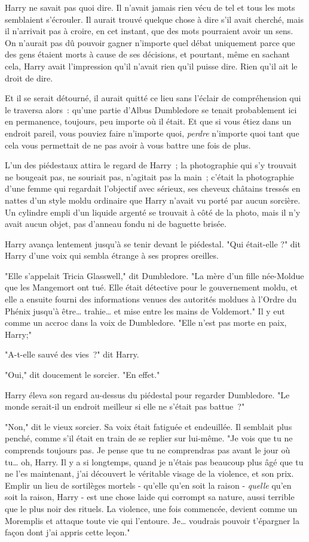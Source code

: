 Harry ne savait pas quoi dire. Il n'avait jamais rien vécu de tel et tous les mots semblaient s'écrouler. Il aurait trouvé quelque chose à dire s'il avait cherché, mais il n'arrivait pas à croire, en cet instant, que des mots pourraient avoir un sens. On n'aurait pas dû pouvoir gagner n'importe quel débat uniquement parce que des gens étaient morts à cause de ses décisions, et pourtant, même en sachant cela, Harry avait l'impression qu'il n'avait rien qu'il puisse dire. Rien qu'il ait le droit de dire.

Et il se serait détourné, il aurait quitté ce lieu sans l'éclair de compréhension qui le traversa alors~: qu'une partie d'Albus Dumbledore se tenait probablement ici en permanence, toujours, peu importe où il était. Et que si vous étiez dans un endroit pareil, vous pouviez faire n'importe quoi, \emph{perdre} n'importe quoi tant que cela vous permettait de ne pas avoir à vous battre une fois de plus.

L'un des piédestaux attira le regard de Harry~; la photographie qui s'y trouvait ne bougeait pas, ne souriait pas, n'agitait pas la main~; c'était la photographie d'une femme qui regardait l'objectif avec sérieux, ses cheveux châtains tressés en nattes d'un style moldu ordinaire que Harry n'avait vu porté par aucun sorcière. Un cylindre empli d'un liquide argenté se trouvait à côté de la photo, mais il n'y avait aucun objet, pas d'anneau fondu ni de baguette brisée.

Harry avança lentement jusqu'à se tenir devant le piédestal. "Qui était-elle ?" dit Harry d'une voix qui sembla étrange à ses propres oreilles.

"Elle s'appelait Tricia Glasswell," dit Dumbledore. "La mère d'un fille née-Moldue que les Mangemort ont tué. Elle était détective pour le gouvernement moldu, et elle a ensuite fourni des informations venues des autorités moldues à l'Ordre du Phénix jusqu'à être… trahie… et mise entre les mains de Voldemort." Il y eut comme un accroc dans la voix de Dumbledore. "Elle n'est pas morte en paix, Harry;"

"A-t-elle sauvé des vies~?" dit Harry.

"Oui," dit doucement le sorcier. "En effet."

Harry éleva son regard au-dessus du piédestal pour regarder Dumbledore. "Le monde serait-il un endroit meilleur si elle ne s'était pas battue~?"

"Non," dit le vieux sorcier. Sa voix était fatiguée et endeuillée. Il semblait plus penché, comme s'il était en train de se replier sur lui-même. "Je vois que tu ne comprends toujours pas. Je pense que tu ne comprendras pas avant le jour où tu… oh, Harry. Il y a si longtemps, quand je n'étais pas beaucoup plus âgé que tu ne l'es maintenant, j'ai découvert le véritable visage de la violence, et son prix. Emplir un lieu de sortilèges mortels - qu'elle qu'en soit la raison - \emph{quelle} qu'en soit la raison, Harry - est une chose laide qui corrompt sa nature, aussi terrible que le plus noir des rituels. La violence, une fois commencée, devient comme un Moremplis et attaque toute vie qui l'entoure. Je… voudrais pouvoir t'épargner la façon dont j'ai appris cette leçon."

